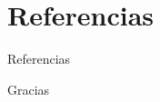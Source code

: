 \section{Referencias}
\begin{frame}{Referencias}
    
  
\end{frame}


\begin{frame}{Gracias}
    
\end{frame}


